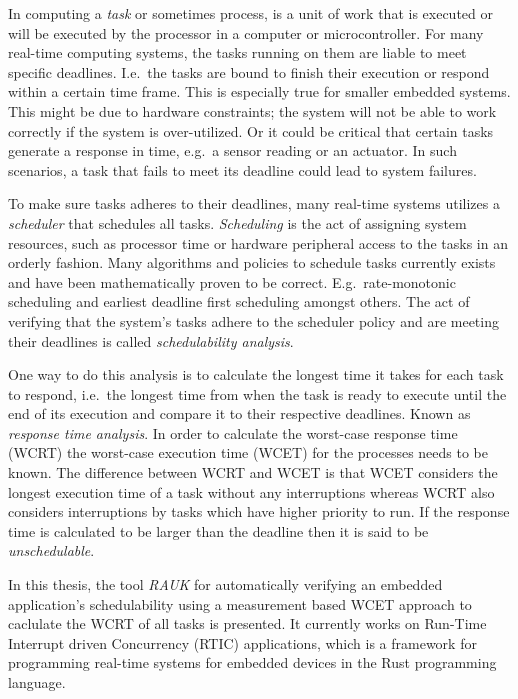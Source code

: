 In computing a \emph{task} or sometimes process, is a unit of work that is
executed or will be executed by the processor in a computer or microcontroller.
For many real-time computing systems, the tasks running on them are liable to
meet specific deadlines. I.e.\ the tasks are bound to finish their execution or
respond within a certain time frame. This is especially true for smaller
embedded systems. This might be due to hardware constraints; the system will
not be able to work correctly if the system is over-utilized. Or it could be
critical that certain tasks generate a response in time, e.g.\ a sensor reading
or an actuator. In such scenarios, a task that fails to meet its deadline could
lead to system failures.

To make sure tasks adheres to their deadlines, many real-time systems utilizes
a \emph{scheduler} that schedules all tasks. \emph{Scheduling} is the act of
assigning system resources, such as processor time or hardware peripheral
access to the tasks in an orderly fashion. Many algorithms and policies to
schedule tasks currently exists and have been mathematically proven to be
correct.  E.g.\ rate-monotonic scheduling\cite{ratemonotonic} and earliest
deadline first scheduling\cite{edf} amongst others.  The act of verifying that
the system's tasks adhere to the scheduler policy and are meeting their
deadlines is called \emph{schedulability analysis}.

One way to do this analysis is to calculate the longest time it takes for each
task to respond, i.e.\ the longest time from when the task is ready to execute
until the end of its execution and compare it to their respective deadlines.
Known as \emph{response time analysis}. In order to calculate the worst-case
response time (WCRT) the worst-case execution time (WCET) for the processes
needs to be known. The difference between WCRT and WCET is that WCET considers
the longest execution time of a task without any interruptions whereas WCRT
also considers interruptions by tasks which have higher priority to
run\cite{hardrealtimecomputingsystems}. If the response time is calculated to
be larger than the deadline then it is said to be \emph{unschedulable}.

In this thesis, the tool \emph{RAUK} for automatically verifying an embedded
application's schedulability using a measurement based WCET approach to
caclulate the WCRT of all tasks is presented. It currently works on
Run-Time Interrupt driven Concurrency (RTIC) applications, which is a framework
for programming real-time systems for embedded devices in the Rust programming
language.

